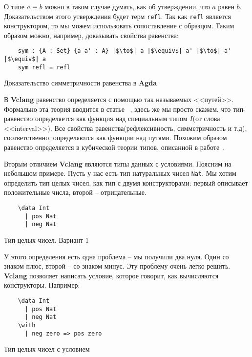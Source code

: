 О типе $a \equiv b$ можно в таком случае думать, как об утверждении, что $a$ равен $b$. Доказательством этого утверждения будет терм \texttt{refl}. Так как \texttt{refl} является конструктором, то мы можем использовать сопоставление с образцом. Таким образом можно, например, доказывать свойства равенства:

\begin{listing}[H]
  \begin{verbatim}
    sym : {A : Set} {a a' : A} |$\to$| a |$\equiv$| a' |$\to$| a' |$\equiv$| a
    sym refl = refl
  \end{verbatim}
  \caption{Доказательство симметричности равенства в \textbf{Agda}}
\end{listing}

В \textbf{Vclang} равенство определяется с помощью так называемых <<путей>>. Формально эта теория вводится в статье~ \cite{isaev2016model}, здесь же мы просто скажем, что тип-равенство определяется как функция над специальным типом $I$(от слова <<interval>>). Все свойства равенства(рефлексивность, симметричность и т.д), соответственно, определяются как функции над путями. Похожим образом равенство определяется в кубической теории типов, описанной в работе~\cite{cohen2016cubical}.

Вторым отличием \textbf{Vclang} являются типы данных с условиями. Поясним на небольшом примере. Пусть у нас есть тип натуральных чисел \texttt{Nat}. Мы хотим определить тип целых чисел, как тип с двумя конструкторами: первый описывает положительные числа, второй -- отрицательные.

\begin{listing}[H]
  \begin{verbatim}
    \data Int
      | pos Nat
      | neg Nat
  \end{verbatim}
  \caption{Тип целых чисел. Вариант 1}
\end{listing}

У этого определения есть одна проблема -- мы получили два нуля. Один со знаком плюс, второй -- со знаком минус. Эту проблему очень легко решить. \textbf{Vclang} позволяет написать условие, которое говорит, как вычисляются конструкторы. Например:

\begin{listing}[H]
  \begin{verbatim}
    \data Int
      | pos Nat
      | neg Nat
    \with
      | neg zero => pos zero
  \end{verbatim}
  \caption{Тип целых чисел с условием}
\end{listing}

